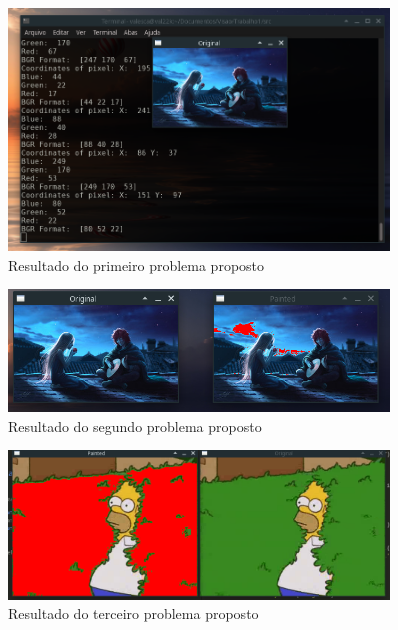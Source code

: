 \documentclass{bmvc2k}
\begin{document}
\begin{figure}[!h]
    \centering
    \includegraphics[width=0.9\textwidth]{Figs/trab1.png}
    \caption{Resultado do primeiro problema proposto}
    \label{fig:trab1}
\end{figure}

\begin{figure}[!h]
    \centering
    \includegraphics[width=0.9\textwidth]{Figs/trab2.png}
    \caption{Resultado do segundo problema proposto}
    \label{fig:trab2}
\end{figure}

\begin{figure}[!h]
    \centering
    \includegraphics[width=0.9\textwidth]{Figs/trab3.png}
    \caption{Resultado do terceiro problema proposto}
    \label{fig:trab3}
\end{figure}
 \FloatBarrier
\end{document}
